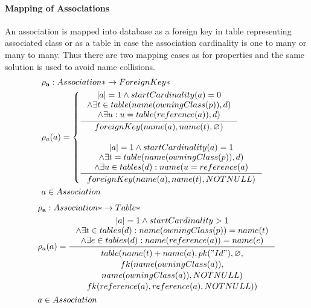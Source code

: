 \documentclass[11pt]{article}
\begin{document}
\paragraph{Mapping of Associations} An association is mapped into database as a foreign key in table representing associated class or as a table in case the association cardinality is one to many or many to many. Thus there are two mapping cases as for properties and the same solution is used to avoid name collisions.
\begin{align*}
&	\mathbf{\rho_a} : Association* \rightarrow ForeignKey* \\
&	\rho_a(a) = \begin{cases}
		\inference{|a| = 1 \wedge  startCardinality(a) = 0 \\ \wedge \exists t \in table(name(owningClass(p)), d) \\ \wedge \exists u : u = table(reference(a)), d)
		}{
			foreignKey(name(a), name(t),  \varnothing) 
	 	}
  \\ \\
 	 \inference{|a| = 1 \wedge  startCardinality(a) = 1 \\ \wedge \exists t = table(name(owningClass(p)), d) \\ \wedge \exists u \in tables(d) : name(u = reference(a)
 	 }{ 
		foreignKey(name(a), name(t),  NOTNULL)
	}	 \end{cases}
\\
&	 a \in Association
\end{align*}
\begin{align*} 
&	\mathbf{\rho_a} : Association* \rightarrow Table* \\
&	\rho_a(a) =
		\inference{|a| = 1 \wedge   startCardinality > 1 \\ \wedge \exists t \in tables(d) : name(owningClass(p)) = name(t) \\ \wedge \exists e \in tables(d) : name(reference(a)) = name(e)
  		}{\begin{gathered}  
		 table(name(t)+name(a), pk("Id"), \varnothing, \\ fk(name(owningClass(a)), \\ name(owningClass(a)), NOTNULL) \\ fk(reference(a), reference(a), NOTNULL)) 
  		\end{gathered}}  
\\
&	 a \in Association
\end{align*}
\end{document}
